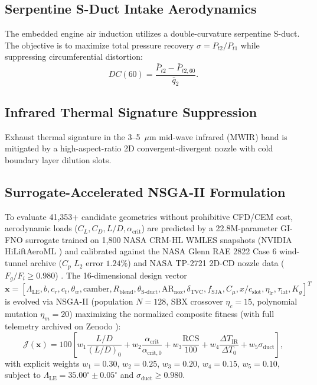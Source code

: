 \documentclass[journal,10pt,twocolumn]{IEEEtran}
\begin{document}
\subsection{Serpentine S-Duct Intake Aerodynamics}
The embedded engine air induction utilizes a double-curvature serpentine S-duct. The objective is to maximize total pressure recovery $\sigma = P_{t2} / P_{t1}$ while suppressing circumferential distortion:
\begin{equation}
DC(60) = \frac{\bar{P}_{t2} - \bar{P}_{t2,60}}{\bar{q}_2}.
\end{equation}

\subsection{Infrared Thermal Signature Suppression}
Exhaust thermal signature in the 3--5~$\mu$m mid-wave infrared (MWIR) band is mitigated by a high-aspect-ratio 2D convergent-divergent nozzle with cold boundary layer dilution slots.

\subsection{Surrogate-Accelerated NSGA-II Formulation}
To evaluate 41,353+ candidate geometries without prohibitive CFD/CEM cost, aerodynamic loads ($C_L, C_D, L/D, \alpha_{\text{crit}}$) are predicted by a 22.8M-parameter GI-FNO surrogate \cite{li2021fno} trained on 1,800 NASA CRM-HL WMLES snapshots (NVIDIA HiLiftAeroML \cite{hiliftaeroml2024}) and calibrated against the NASA Glenn RAE 2822 Case 6 wind-tunnel archive ($C_p$ $L_2$ error $1.24\%$) \cite{cook1979rae2822} and NASA TP-2721 2D-CD nozzle data ($F_g/F_i \ge 0.980$) \cite{berrier1987tp2721}. The 16-dimensional design vector $\mathbf{x} = [\Lambda_{\text{LE}}, b, c_r, c_t, \theta_w, \text{camber}, R_{\text{blend}}, \theta_{\text{S-duct}}, \text{AR}_{\text{noz}}, \delta_{\text{TVC}}, f_{\text{SJA}}, C_\mu, x/c_{\text{slot}}, \eta_{\text{lr}}, \tau_{\text{lat}}, K_g]^T$ is evolved via NSGA-II \cite{deb2002fast} (population $N = 128$, SBX crossover $\eta_c = 15$, polynomial mutation $\eta_m = 20$) maximizing the normalized composite fitness (with full telemetry archived on Zenodo \cite{dixit2026zenodo}):
\begin{equation}
\mathcal{J}(\mathbf{x}) = 100 \left[ w_1 \frac{L/D}{(L/D)_0} + w_2 \frac{\alpha_{\text{crit}}}{\alpha_{\text{crit},0}} + w_3 \frac{\text{RCS}}{100} + w_4 \frac{\Delta T_{\text{IR}}}{\Delta T_0} + w_5 \sigma_{\text{duct}} \right],
\end{equation}
with explicit weights $w_1 = 0.30$, $w_2 = 0.25$, $w_3 = 0.20$, $w_4 = 0.15$, $w_5 = 0.10$, subject to $\Lambda_{\text{LE}} = 35.00^\circ \pm 0.05^\circ$ and $\sigma_{\text{duct}} \ge 0.980$.
\end{document}
